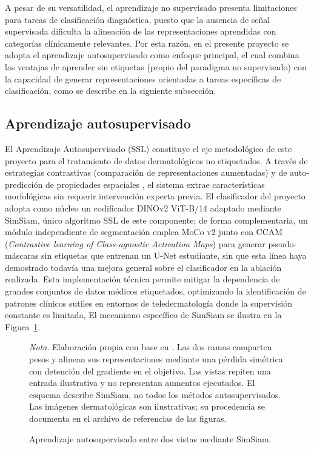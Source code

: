 A pesar de su versatilidad, el aprendizaje no supervisado presenta limitaciones para tareas de clasificación diagnóstica, puesto que la ausencia de señal supervisada dificulta la alineación de las representaciones aprendidas con categorías clínicamente relevantes. Por esta razón, en el presente proyecto se adopta el aprendizaje autosupervisado como enfoque principal, el cual combina las ventajas de aprender sin etiquetas (propio del paradigma no supervisado) con la capacidad de generar representaciones orientadas a tareas específicas de clasificación, como se describe en la siguiente subsección.

\subsection{Aprendizaje autosupervisado}

El Aprendizaje Autosupervisado (SSL) constituye el eje metodológico de este proyecto para el tratamiento de datos dermatológicos no etiquetados. A través de estrategias contrastivas (comparación de representaciones aumentadas) y de auto-predicción de propiedades espaciales \parencite{chaitanya2023localcontrastive}, el sistema extrae características morfológicas sin requerir intervención experta previa. El clasificador del proyecto adopta como núcleo un codificador DINOv2 ViT-B/14 adaptado mediante SimSiam, único algoritmo SSL de este componente; de forma complementaria, un módulo independiente de segmentación emplea MoCo v2 junto con CCAM (\emph{Contrastive learning of Class-agnostic Activation Maps}) para generar pseudo-máscaras sin etiquetas que entrenan un U-Net estudiante, sin que esta línea haya demostrado todavía una mejora general sobre el clasificador en la ablación realizada. Esta implementación técnica permite mitigar la dependencia de grandes conjuntos de datos médicos etiquetados, optimizando la identificación de patrones clínicos sutiles en entornos de teledermatología donde la supervisión constante es limitada, El mecanismo específico de SimSiam se ilustra en la Figura~\ref{fig:original-9}.

\begin{figure}[!htbp]
\caption{Aprendizaje autosupervisado entre dos vistas mediante SimSiam.}
\label{fig:original-9}
\centering

\par\smallskip
\begingroup\footnotesize\singlespacing\raggedright
\textit{Nota.} Elaboración propia con base en \parencite{chen2021simsiam}. Las dos ramas comparten pesos y alinean sus representaciones mediante una pérdida simétrica con detención del gradiente en el objetivo. Las vistas repiten una entrada ilustrativa y no representan aumentos ejecutados. El esquema describe SimSiam, no todos los métodos autosupervisados. Las imágenes dermatológicas son ilustrativas; su procedencia se documenta en el archivo de referencias de las figuras.
\par\endgroup
\end{figure}



